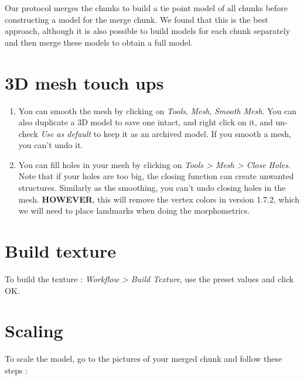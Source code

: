 \documentclass[
]{book}
\begin{document}
Our protocol merges the chunks to build a tie point model of all chunks
before constructing a model for the merge chunk. We found that this is
the best approach, although it is also possible to build models for each
chunk separately and then merge these models to obtain a full model.

\hypertarget{d-mesh-touch-ups}{%
\section{3D mesh touch ups}\label{d-mesh-touch-ups}}

\begin{enumerate}
\def\labelenumi{\arabic{enumi}.}
\item
  You can smooth the mesh by clicking on \emph{Tools}, \emph{Mesh}, \emph{Smooth
  Mesh}. You can also duplicate a 3D model to save one intact, and
  right click on it, and un-check \emph{Use as default} to keep it as an
  archived model. If you smooth a mesh, you can't undo it.
\item
  You can fill holes in your mesh by clicking on \emph{Tools \textgreater{} Mesh \textgreater{}
  Close Holes}. Note that if your holes are too big, the closing
  function can create unwanted structures. Similarly as the smoothing,
  you can't undo closing holes in the mesh. \textbf{HOWEVER}, this will
  remove the vertex colors in version 1.7.2, which we will need to
  place landmarks when doing the morphometrics.
\end{enumerate}

\hypertarget{build-texture}{%
\section{Build texture}\label{build-texture}}

To build the texture : \emph{Workflow \textgreater{} Build Texture}, use the preset
values and click OK.

\hypertarget{scaling}{%
\section{Scaling}\label{scaling}}

To scale the model, go to the pictures of your merged chunk and follow
these steps :
\end{document}
